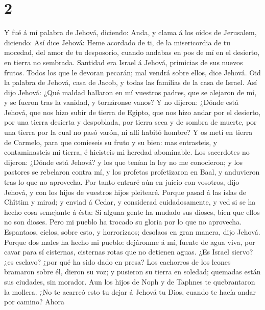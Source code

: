 \hypertarget{section-1}{%
\section{2}\label{section-1}}

 Y fué á mí palabra de Jehová, diciendo:  Anda,
y clama á los oídos de Jerusalem, diciendo: Así dice Jehová: Heme
acordado de ti, de la misericordia de tu mocedad, del amor de tu
desposorio, cuando andabas en pos de mí en el desierto, en tierra no
sembrada.  Santidad era Israel á Jehová, primicias de sus
nuevos frutos. Todos los que le devoran pecarán; mal vendrá sobre ellos,
dice Jehová.  Oid la palabra de Jehová, casa de Jacob, y
todas las familias de la casa de Israel.  Así dijo Jehová:
¿Qué maldad hallaron en mí vuestros padres, que se alejaron de mí, y se
fueron tras la vanidad, y tornáronse vanos?  Y no dijeron:
¿Dónde está Jehová, que nos hizo subir de tierra de Egipto, que nos hizo
andar por el desierto, por una tierra desierta y despoblada, por tierra
seca y de sombra de muerte, por una tierra por la cual no pasó varón, ni
allí habitó hombre?  Y os metí en tierra de Carmelo, para
que comieseis su fruto y su bien: mas entrasteis, y contaminasteis mi
tierra, é hicisteis mi heredad abominable.  Los sacerdotes
no dijeron: ¿Dónde está Jehová? y los que tenían la ley no me
conocieron; y los pastores se rebelaron contra mí, y los profetas
profetizaron en Baal, y anduvieron tras lo que no aprovecha.
 Por tanto entraré aún en juicio con vosotros, dijo Jehová,
y con los hijos de vuestros hijos pleitearé.  Porque pasad
á las islas de Chîttim y mirad; y enviad á Cedar, y considerad
cuidadosamente, y ved si se ha hecho cosa semejante á ésta:
 Si alguna gente ha mudado sus dioses, bien que ellos no
son dioses. Pero mi pueblo ha trocado su gloria por lo que no aprovecha.
 Espantaos, cielos, sobre esto, y horrorizaos; desolaos en
gran manera, dijo Jehová.  Porque dos males ha hecho mi
pueblo: dejáronme á mí, fuente de agua viva, por cavar para sí
cisternas, cisternas rotas que no detienen aguas.  ¿Es
Israel siervo? ¿es esclavo? ¿por qué ha sido dado en presa?
 Los cachorros de los leones bramaron sobre él, dieron su
voz; y pusieron su tierra en soledad; quemadas están sus ciudades, sin
morador.  Aun los hijos de Noph y de Taphnes te
quebrantaron la mollera.  ¿No te acarreó esto tu dejar á
Jehová tu Dios, cuando te hacía andar por camino?  Ahora

